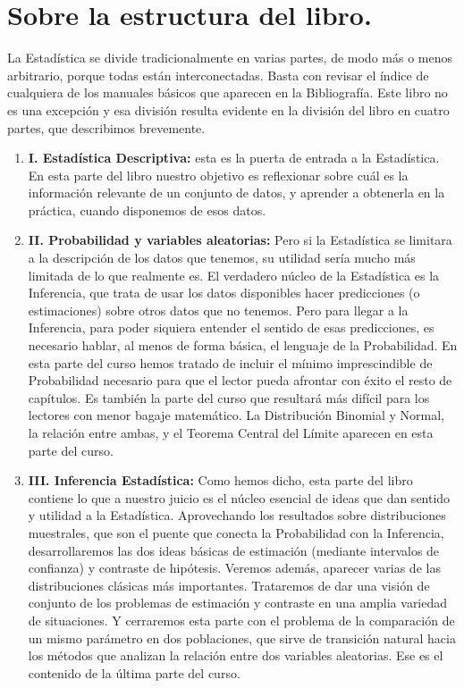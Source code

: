 \section*{Sobre la estructura del libro.}

La Estadística se divide tradicionalmente en varias partes, de modo más o menos arbitrario, porque todas están interconectadas. Basta con revisar el índice de cualquiera de los manuales básicos que aparecen en la Bibliografía. Este libro no es una excepción y esa división resulta evidente en la división del libro en cuatro partes, que describimos brevemente.

\begin{enumerate}
  \item[]{\bf I. Estadística Descriptiva:} esta es la puerta de entrada a la Estadística. En esta parte del libro nuestro objetivo es reflexionar sobre cuál es la información relevante de un conjunto de datos, y aprender a obtenerla en la práctica, cuando disponemos de esos datos.

  \item[]{\bf II. Probabilidad y variables aleatorias:} Pero si la Estadística se limitara a la descripción de los datos que tenemos, su utilidad sería mucho más limitada de lo que realmente es. El verdadero núcleo de la Estadística es la Inferencia, que trata de usar los datos disponibles hacer predicciones (o estimaciones) sobre otros datos que no tenemos. Pero para llegar a la Inferencia, para poder siquiera entender el sentido de esas predicciones, es necesario hablar, al menos de forma básica, el lenguaje de la Probabilidad. En esta parte del curso hemos tratado de incluir el mínimo imprescindible de Probabilidad necesario para que el lector pueda afrontar con éxito el resto de capítulos. Es también la parte del curso que resultará más difícil para los lectores con menor bagaje matemático. La Distribución Binomial y Normal, la relación entre ambas, y el Teorema Central del Límite aparecen en esta parte del curso.

  \item[]{\bf III. Inferencia Estadística:} Como hemos dicho, esta parte del libro contiene lo que a nuestro juicio es el núcleo esencial de ideas que dan sentido y utilidad a la Estadística. Aprovechando los resultados sobre distribuciones muestrales, que son el puente que conecta la Probabilidad con la Inferencia, desarrollaremos las dos ideas básicas de estimación (mediante intervalos de confianza) y contraste de hipótesis. Veremos además, aparecer varias de las distribuciones clásicas más importantes. Trataremos de dar una visión de conjunto de los problemas de estimación y contraste en una amplia variedad de situaciones. Y cerraremos esta parte con el problema de la comparación de un mismo parámetro en dos poblaciones, que sirve de transición natural hacia los métodos que analizan la relación entre dos variables aleatorias. Ese es el contenido de la última parte del curso.


\end{enumerate}
